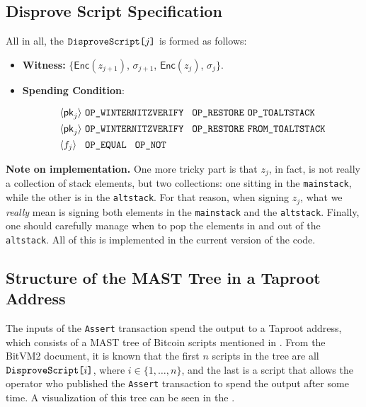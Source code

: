 \documentclass{iacrtrans}
\newcommand{\elem}[1]{\, \langle #1 \rangle \,}
\newcommand{\opcode}[1]{\, \texttt{#1} \,}
\begin{document}
\subsection{Disprove Script Specification}

All in all, the $\texttt{DisproveScript[\text{$j$}]}$ is formed as follows:
\begin{itemize}
  \item \textbf{Witness:} $\Big\{\mathsf{Enc}(z_{j+1})$, $\sigma_{j+1}$, $\mathsf{Enc}(z_{j})$, $\sigma_j\Big\}$.
  \item \textbf{Spending Condition}:
  \begin{empheqboxed}
    \begin{align*}
      &\elem{\mathsf{pk}_j} \opcode{\texttt{OP\_WINTERNITZVERIFY} } \opcode{\texttt{OP\_RESTORE}} \opcode{\texttt{OP\_TOALTSTACK}} \\
      &\elem{\mathsf{pk}_{j}} \opcode{\texttt{OP\_WINTERNITZVERIFY} } \opcode{\texttt{OP\_RESTORE}} \opcode{\texttt{FROM\_TOALTSTACK}} \\
      &\elem{f_j} \opcode{ \texttt{OP\_EQUAL} } \opcode{\texttt{OP\_NOT}}
    \end{align*}
  \end{empheqboxed}
\end{itemize}

\textbf{Note on implementation.} One more tricky part is that $z_j$, in fact, is
not really a collection of stack elements, but two collections: one sitting in
the \texttt{mainstack}, while the other is in the \texttt{altstack}. For that
reason, when signing $z_j$, what we \textit{really} mean is signing both
elements in the \texttt{mainstack} and the \texttt{altstack}. Finally, one
should carefully manage when to pop the elements in and out of the
\texttt{altstack}. All of this is implemented in the current version of the
code.

\subsection{Structure of the MAST Tree in a Taproot
Address}\label{sec:mast-tree-structure}

The inputs of the \texttt{Assert} transaction spend the output to a Taproot
address, which consists of a MAST tree of Bitcoin scripts mentioned in
. From the BitVM2 document, it is known that the first \(n\)
scripts in the tree are all \(\texttt{DisproveScript[\text{$i$}]}\), where \(i
\in \{1,\dots, n\}\), and the last is a script that allows the operator who
published the \texttt{Assert} transaction to spend the output after some time. A
visualization of this tree can be seen in the .
\end{document}
